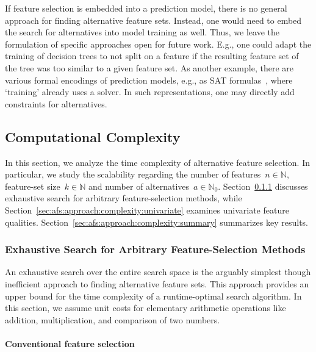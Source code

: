 \documentclass{article}
\theoremstyle{definition}
\begin{document}
If feature selection is embedded into a prediction model, there is no general approach for finding alternative feature sets.
Instead, one would need to embed the search for alternatives into model training as well.
Thus, we leave the formulation of specific approaches open for future work.
E.g., one could adapt the training of decision trees to not split on a feature if the resulting feature set of the tree was too similar to a given feature set.
As another example, there are various formal encodings of prediction models, e.g., as \textsc{SAT} formulas~\cite{narodytska2018learning, schidler2021sat, yu2021learning}, where `training' already uses a solver.
In such representations, one may directly add constraints for alternatives.

\subsection{Computational Complexity}
\label{sec:afs:approach:complexity}

In this section, we analyze the time complexity of alternative feature selection.
In particular, we study the scalability regarding the number of features~$n \in \mathbb{N}$, feature-set size~$k \in \mathbb{N}$ and number of alternatives~$a \in \mathbb{N}_0$.
Section~\ref{sec:afs:approach:complexity:exhaustive} discusses exhaustive search for arbitrary feature-selection methods, while Section~\ref{sec:afs:approach:complexity:univariate} examines univariate feature qualities.
Section~\ref{sec:afs:approach:complexity:summary} summarizes key results.

\subsubsection{Exhaustive Search for Arbitrary Feature-Selection Methods}
\label{sec:afs:approach:complexity:exhaustive}

An exhaustive search over the entire search space is the arguably simplest though inefficient approach to finding alternative feature sets.
This approach provides an upper bound for the time complexity of a runtime-optimal search algorithm.
In this section, we assume unit costs for elementary arithmetic operations like addition, multiplication, and comparison of two numbers.

\paragraph{Conventional feature selection}
\end{document}
